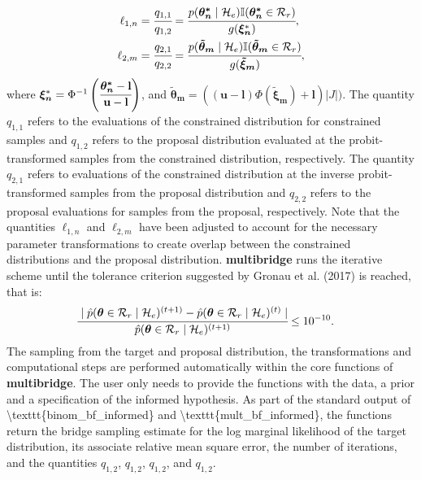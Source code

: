 \documentclass[
  english,
  man,floatsintext]{apa6}
\begin{document}
\begin{align}
    \ell_{1,n} &= \cfrac{q_{1,1}}{q_{1,2}}  = \cfrac{p(\boldsymbol{\theta^*_n}\mid \mathcal{H}_e) \mathbb{I}(\boldsymbol{\theta^*_n}\in\mathcal{R}_r)}{g(\boldsymbol{\xi_n}^*)},\\
    \ell_{2,m} &= \cfrac{q_{2,1}}{q_{2,2}} = \cfrac{p(\boldsymbol{\tilde \theta_m}\mid \mathcal{H}_e) \mathbb{I}(\boldsymbol{\tilde \theta_m}\in\mathcal{R}_r)}{g(\boldsymbol{\tilde \xi_m})},
\end{align}
where \(\boldsymbol{\xi_n}^* = \Phi^{-1}\left(\cfrac{\boldsymbol{\theta^*_n} - \mathbf{l}}{\mathbf{u} - \mathbf{l}}\right)\), and \(\boldsymbol{\tilde \theta_m} = ((\mathbf{u} - \mathbf{l})\Phi(\boldsymbol{\tilde \xi_m}) + \mathbf{l}) \left|J\right|)\). The quantity \(q_{1,1}\) refers to the evaluations of the constrained distribution for constrained samples and \(q_{1,2}\) refers to the proposal distribution evaluated at the probit-transformed samples from the constrained distribution, respectively. The quantity \(q_{2,1}\) refers to evaluations of the constrained distribution at the inverse probit-transformed samples from the proposal distribution and \(q_{2,2}\) refers to the proposal evaluations for samples from the proposal, respectively. Note that the quantities \(\ell_{1,n}\) and \(\ell_{2,m}\) have been adjusted to account for the necessary parameter transformations to create overlap between the constrained distributions and the proposal distribution. \textbf{multibridge} runs the iterative scheme until the tolerance criterion suggested by Gronau et al. (2017) is reached, that is:
\begin{align*}
\cfrac{\mid \hat p(\boldsymbol{\theta} \in \mathcal{R}_r \mid \mathcal{H}_e)^{(t + 1)} - \hat p(\boldsymbol{\theta} \in \mathcal{R}_r \mid \mathcal{H}_e)^{(t)} \mid}{\hat p(\boldsymbol{\theta} \in \mathcal{R}_r \mid \mathcal{H}_e)^{(t + 1)}} &\leq 10^{-10}.
\end{align*}
The sampling from the target and proposal distribution, the transformations and computational steps are performed automatically within the core functions of \textbf{multibridge}. The user only needs to provide the functions with the data, a prior and a specification of the informed hypothesis. As part of the standard output of \textbackslash texttt\{binom\_bf\_informed\} and \textbackslash texttt\{mult\_bf\_informed\}, the functions return the bridge sampling estimate for the log marginal likelihood of the target distribution, its associate relative mean square error, the number of iterations, and the quantities \(q_{1,2}\), \(q_{1,2}\), \(q_{1,2}\), and \(q_{1,2}\).
\end{document}
